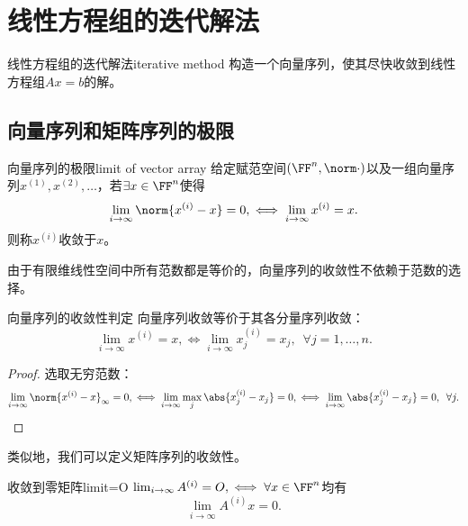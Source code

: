 \chapter{线性方程组的迭代解法}

\begin{definition}
    {线性方程组的迭代解法}{iterative method}
    构造一个向量序列，使其尽快收敛到线性方程组$Ax=b$的解。
\end{definition}

\section{向量序列和矩阵序列的极限}

\begin{definition}
    {向量序列的极限}{limit of vector array}
    给定赋范空间$(\FF^n,\norm\cdot)$以及一组向量序列$x^{(1)},x^{(2)},\ldots$，若$\exists x\in\FF^n$使得
    \begin{equation}
        \lim_{i\to\infty}\norm{x^{(i)}-x}=0,\iff\lim_{i\to\infty}x^{(i)}=x.
    \end{equation}
    则称$x^{(i)}$收敛于$x$。
\end{definition}

\begin{remark}
    由于有限维线性空间中所有范数都是等价的，向量序列的收敛性不依赖于范数的选择。
\end{remark}

\begin{theorem}
    {向量序列的收敛性判定}{}
    向量序列收敛等价于其各分量序列收敛：
    \begin{equation}
        \lim_{i\to\infty}x^{(i)}=x,\iff\lim_{i\to\infty}x^{(i)}_j=x_j,\enspace \forall j=1,\ldots,n.
    \end{equation}
\end{theorem}

\begin{proof}
    选取无穷范数：
    \[
        \lim_{i\to\infty}\norm{x^{(i)}-x}_\infty=0,\iff\lim_{i\to\infty}\max_j\abs{x^{(i)}_j-x_j}=0,\iff\lim_{i\to\infty}\abs{x^{(i)}_j-x_j}=0,\enspace\forall j.
        \qedhere
    \]
\end{proof}

\begin{remark}
    类似地，我们可以定义矩阵序列的收敛性。
\end{remark}

\begin{theorem}
    {收敛到零矩阵}{limit=O}
    $\lim_{i\to\infty}A^{(i)}=O,\iff\forall x\in\FF^n$均有
    \[
        \lim_{i\to\infty}A^{(i)}x=0.
    \]
\end{theorem}

